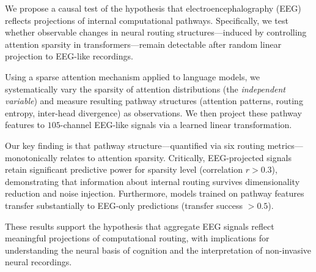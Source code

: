 We propose a causal test of the hypothesis that electroencephalography (EEG) reflects projections of internal computational pathways. Specifically, we test whether observable changes in neural routing structures—induced by controlling attention sparsity in transformers—remain detectable after random linear projection to EEG-like recordings. 

Using a sparse attention mechanism applied to language models, we systematically vary the sparsity of attention distributions (the \textit{independent variable}) and measure resulting pathway structures (attention patterns, routing entropy, inter-head divergence) as observations. We then project these pathway features to $105$-channel EEG-like signals via a learned linear transformation.

Our key finding is that pathway structure—quantified via six routing metrics—monotonically relates to attention sparsity. Critically, EEG-projected signals retain significant predictive power for sparsity level (correlation $r > 0.3$), demonstrating that information about internal routing survives dimensionality reduction and noise injection. Furthermore, models trained on pathway features transfer substantially to EEG-only predictions (transfer success $> 0.5$).

These results support the hypothesis that aggregate EEG signals reflect meaningful projections of computational routing, with implications for understanding the neural basis of cognition and the interpretation of non-invasive neural recordings.
